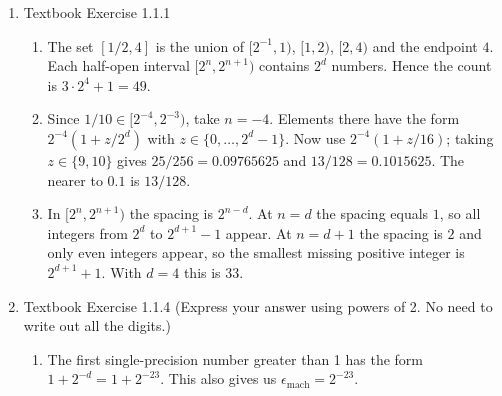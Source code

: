 \documentclass[reqno, answers]{exam}
\begin{document}
\begin{enumerate}
\begin{solution}
\begin{enumerate}
  \item Computing $(a + b) - c$:
  \begin{align*}
    a &= 823.4 = 8.234 \times 10^{2} \quad \text{truncated:} \quad 8.234 \times 10^{2} \\
    b &= 723.45234 = 7.2345234 \times 10^{2} \quad \text{truncated:} \quad 7.234 \times 10^{2} \\
    a + b &= 8.234 \times 10^{2} + 7.234 \times 10^{2} = 1546.8 = 1.5468 \times 10^3 \\
    \text{truncated:} & \quad 1.546 \times 10^3 \\
    (a + b) - c &= 1.546 \times 10^{3} - 7.234 \times 10^{2} = 822.6 = 8.226 \times 10^{2} \\
    \text{truncated:} & \quad \boxed{8.226 \times 10^{2}}
  \end{align*}

\end{enumerate}
\end{solution}


\item Textbook Exercise 1.1.1

\begin{solution}
  \begin{enumerate}
    \item The set $[1/2,4]$ is the union of $[2^{-1},1)$, $[1,2)$, $[2,4)$ and the endpoint $4$. Each half-open interval $[2^n,2^{n+1})$ contains $2^d$ numbers. Hence the count is $3\cdot 2^4 + 1 = 49$.
    \item Since $1/10 \in [2^{-4},2^{-3})$, take $n=-4$. Elements there have the form $2^{-4}(1+z/2^d)$ with $z\in\{0,\dots,2^d-1\}$. Now use $2^{-4}(1+z/16)$; taking $z\in\{9,10\}$ gives $25/256=0.09765625$ and $13/128=0.1015625$. The nearer to $0.1$ is $13/128$.
    \item In $[2^n,2^{n+1})$ the spacing is $2^{n-d}$. At $n=d$ the spacing equals $1$, so all integers from $2^d$ to $2^{d+1}-1$ appear. At $n=d+1$ the spacing is $2$ and only even integers appear, so the smallest missing positive integer is $2^{d+1}+1$. With $d=4$ this is $33$.
\end{enumerate}

\end{solution}

\item Textbook Exercise 1.1.4 (Express your answer using powers of 2. No need to write out all the digits.)
\begin{solution}
\begin{enumerate}
  \item The first single-precision number greater than 1 has the form $1 + 2^{-d} = 1 + 2^{-23}$. This also gives us $\epsilon_{\text{mach}} = 2^{-23}$.
  

\end{enumerate}
\end{solution}
\end{enumerate}
\end{document}
